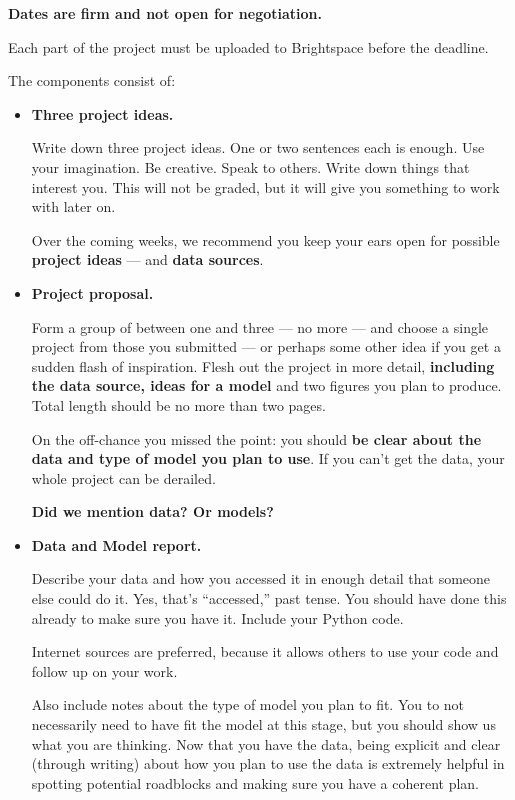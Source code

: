 \documentclass[11pt]{article}
\begin{document}
{\bf Dates are firm and not open for negotiation.}

Each part of the project must be uploaded to Brightspace before the deadline.


The components consist of:
\begin{itemize}

      \item {\bf Three project ideas.}

            Write down three project ideas. One or two sentences each is enough.
            Use your imagination.  Be creative.  Speak to others. Write down
            things that interest you. This will not be graded, but it will give
            you something to work with later on.

            Over the coming weeks, we recommend you keep your ears open for
            possible {\bf project ideas} --- and {\bf data sources\/}.

            \item{\bf Project proposal.}

            Form a group of between one and three --- no more --- and choose a
            single project from those you submitted --- or perhaps some other idea
            if you get a sudden flash of inspiration. Flesh out the project in more
            detail, {\bf including the data source, ideas for a model\/} and two
            figures you plan to produce. Total length should be no more than
            two pages.

            On the off-chance you missed the point:  you should {\bf be clear
                        about the data and type of model you plan to use\/}. If
            you can't get the data, your whole project can be
            derailed.

                  {\bf Did we mention data? Or models?}

      \item {\bf Data and Model report.}

            Describe your data and how you accessed it in enough detail that someone else
            could do it. Yes, that's ``accessed,'' past tense.  You should have done this
            already to make sure you have it. Include your Python code.

            Internet sources are preferred, because it allows others to use your code and
            follow up on your work.

            Also include notes about the type of model you plan to fit. You to
            not necessarily need to have fit the model at this stage, but you
            should show us what you are thinking. Now that you have the data,
            being explicit and clear (through writing) about how you plan to use
            the data is extremely helpful in spotting potential roadblocks and
            making sure you have a coherent plan.


\end{itemize}
\end{document}
